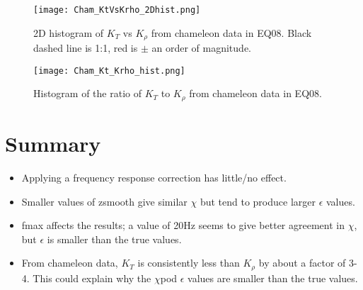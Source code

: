 \documentclass[11pt]{article}
\begin{document}
\begin{figure}[htbp]
\texttt{[image: Cham\_KtVsKrho\_2Dhist.png]}
\caption{2D histogram of $K_T$ vs $K_{\rho}$ from chameleon data in EQ08. Black dashed line is 1:1, red is $\pm$ an order of magnitude.}
\label{2dhist_Kt_Krho}
\end{figure}


\begin{figure}[htbp]
\texttt{[image: Cham\_Kt\_Krho\_hist.png]}
\caption{Histogram of the ratio of $K_T$ to $K_{\rho}$ from chameleon data in EQ08.}
\label{}
\end{figure}





\clearpage
\newpage
\section{Summary}

\begin{itemize}
\item Applying a frequency response correction has little/no effect.
\item Smaller values of zsmooth give similar $\chi$ but tend to produce larger $\epsilon$ values.
\item fmax affects the results; a value of 20Hz seems to give better agreement in $\chi$, but $\epsilon$ is smaller than the true values.
\item From chameleon data, $K_T$ is consistently less than $K_{\rho}$ by about a factor of 3-4. This could explain why the $\chi$pod $\epsilon$ values are smaller than the true values.
\end{itemize}



 

\end{document}
